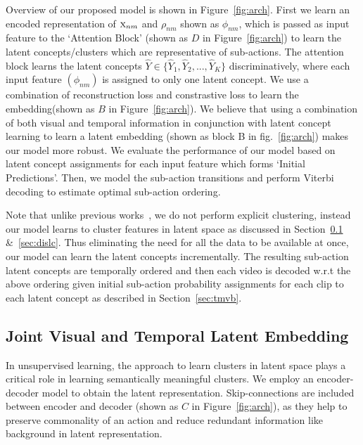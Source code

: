 \documentclass[final]{cvpr}
\begin{document}
\par Overview of our proposed model is shown in Figure~\ref{fig:arch}. First we learn an encoded representation of $\textsc{x}_{nm}$ and $\rho_{nm}$ shown as $\phi_{nm}$,
which is passed as input feature to the `Attention Block' (shown as $D$ in Figure~\ref{fig:arch}) to learn the latent concepts/clusters which are representative of sub-actions.
The attention block learns the latent concepts $\widehat{Y} \in \{\widehat{Y}_1, \widehat{Y}_2,..., \widehat{Y}_K\}$ discriminatively, where each input feature $(\phi_{nm})$ is assigned to only one latent concept.
We use a combination of reconstruction loss and constrastive loss to learn the embedding(shown as $B$ in Figure~\ref{fig:arch}). 
We believe that using a combination of both visual and temporal information in conjunction with latent concept learning to learn a latent embedding (shown as block B in fig.~\ref{fig:arch}) makes our model more robust.
We evaluate the performance of our model based on latent concept assignments for each input feature which forms `Initial Predictions'. 
Then, we model the sub-action transitions and perform Viterbi decoding to estimate optimal sub-action ordering.

\par Note that unlike previous works~\cite{kukleva2019unsupervised}, we do not perform explicit clustering, instead our model learns to cluster features in latent space as discussed in Section~\ref{sec:jvtl} \&~\ref{sec:dislc}. 
Thus eliminating the need for all the data to be available at once, our model can learn the latent concepts incrementally. %
The resulting sub-action latent concepts are temporally ordered and then each video is decoded w.r.t the above ordering given initial sub-action probability assignments for each clip to each latent concept as described in Section~\ref{sec:tmvb}.

\subsection{Joint Visual and Temporal Latent Embedding}
\label{sec:jvtl}
\par In unsupervised learning, the approach to learn clusters in latent space plays a critical role in learning semantically meaningful clusters.
We employ an encoder-decoder %
model to obtain the latent representation.
Skip-connections are included between encoder and decoder (shown as $C$ in Figure~\ref{fig:arch}), as they help to preserve commonality of an action and reduce redundant information like background in latent representation.
\end{document}
